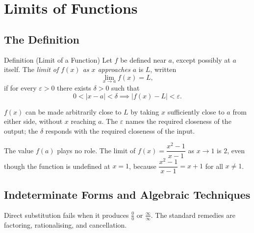 
\section{Limits of Functions}


\subsection*{The Definition}

\begin{propositionbox}{Definition (Limit of a Function)}
Let $f$ be defined near $a$, except possibly at $a$ itself.
The \emph{limit of $f(x)$ as $x$ approaches $a$} is $L$, written
\[
  \lim_{x \to a} f(x) = L,
\]
if for every $\varepsilon > 0$ there exists $\delta > 0$ such that
\[
  0 < |x - a| < \delta \implies |f(x) - L| < \varepsilon.
\]
\end{propositionbox}

\begin{remark*}[Intuition]
$f(x)$ can be made arbitrarily close to $L$ by taking $x$
sufficiently close to $a$ from either side, without $x$ reaching $a$.
The $\varepsilon$ names the required closeness of the output;
the $\delta$ responds with the required closeness of the input.
\end{remark*}

\begin{remark*}
The value $f(a)$ plays no role. The limit of $f(x) = \dfrac{x^2 - 1}{x - 1}$
as $x \to 1$ is $2$, even though the function is undefined at $x = 1$,
because $\dfrac{x^2-1}{x-1} = x + 1$ for all $x \neq 1$.
\end{remark*}


\subsection*{Indeterminate Forms and Algebraic Techniques}

\begin{remark*}
Direct substitution fails when it produces $\tfrac{0}{0}$ or
$\tfrac{\infty}{\infty}$. The standard remedies are factoring,
rationalising, and cancellation.
\end{remark*}

